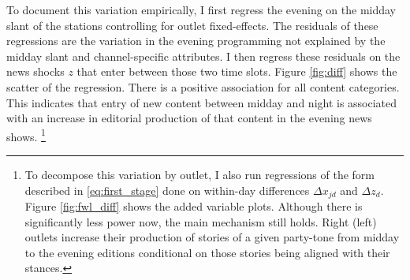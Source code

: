 \documentclass[12pt]{article}
\begin{document}






To document this variation empirically, I first regress the evening on the midday slant of the stations controlling for outlet fixed-effects. The residuals of these regressions are the  variation in the evening programming not explained by the midday slant and channel-specific attributes. I then regress these residuals on the news shocks $z$ that enter between those two time slots. Figure \ref{fig:diff} shows the scatter of the regression.  There is a positive association for all content categories. This indicates that entry of new content between midday and night is associated with an increase in editorial production of that content in the evening news shows. \footnote{To decompose this variation by outlet, I also run regressions of the form described in  \ref{eq:first_stage} done on within-day differences $ \Delta x_{jd}$ and $\Delta z_{d}$. Figure \ref{fig:fwl_diff}  shows the added variable plots. Although there is significantly less power now, the main mechanism still holds. Right (left) outlets increase  their production of stories of a given party-tone from midday to the evening editions conditional on those stories being aligned with their stances. 
} 
\end{document}
